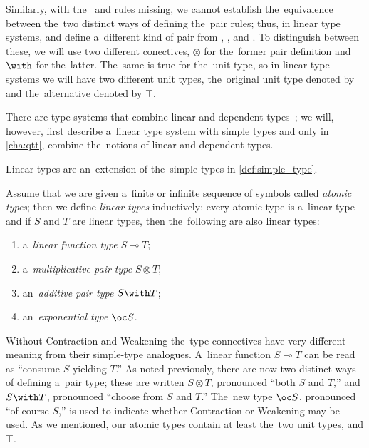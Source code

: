 Similarly, with the~ and  rules missing, we cannot establish
the~equivalence between the~two distinct ways of defining the~pair rules; thus,
in linear type systems,  and  define a~different
kind of pair from , , and
. To distinguish between these, we will use two different
conectives, $\otimes$ for the~former pair definition and $\with$ for the~latter.
The~same is true for the~unit type, so in linear type systems we will have two
different unit types, the~original unit type denoted by \1 and the~alternative
denoted by $\top$.

There are type systems that combine linear and dependent
types~\citep{cervesato_pfenning_2002, krishnaswami_et_al_2015}; we will,
however, first describe a~linear type system with simple types and only in
\autoref{cha:qtt}, combine the~notions of linear and dependent types.


Linear types are an~extension of the~simple types in \autoref{def:simple_type}.

\begin{definition}
  Assume that we are given a~finite or infinite sequence of symbols called
  \emph{atomic types}; then we define \emph{linear types} inductively: every
  atomic type is a~linear type and if $S$ and $T$ are linear types, then
  the~following are also linear types:
  \begin{enumerate}
    \item a~\emph{linear function type} $S \multimap T$;
    \item a~\emph{multiplicative pair type} $S \otimes T$;
    \item an~\emph{additive pair type} $S \with T$;
    \item an~\emph{exponential type} $\oc S$.
  \end{enumerate}
\end{definition}

Without Contraction and Weakening the~type connectives have very different
meaning from their simple-type analogues. A~linear function $S \multimap T$ can
be read as ``consume $S$ yielding $T$.'' As noted previously, there are now two
distinct ways of defining a~pair type; these are written $S \otimes T$,
pronounced ``both $S$ and $T$,'' and $S \with T$, pronounced ``choose from $S$
and $T$.'' The~new type $\oc S$, pronounced ``of course $S$,'' is used to
indicate whether Contraction or Weakening may be used. As we mentioned, our
atomic types contain at least the~two unit types, \1 and $\top$.


